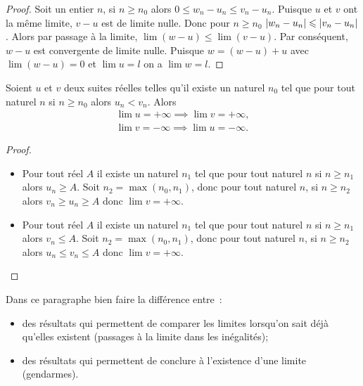 \begin{proof}
    Soit un entier \(n\), si \(n \geqslant n_0\) alors \(0 \leqslant w_n-u_n
    \leqslant v_n -u_n\). Puisque \(u\) et \(v\) ont la même limite, \(v-u\) est
    de limite nulle. Donc pour \(n \geqslant n_0\) \(\left\lvert w_n-u_n\right\rvert \leqslant
    \left\lvert v_n-u_n\right\rvert\). Alors par passage à la limite, \(\lim (w-u) \leqslant \lim
    (v-u)\). Par conséquent, \(w-u\) est convergente de limite nulle. Puisque \(w
    = (w-u)+u\) avec \(\lim (w-u) = 0\) et \(\lim u = l\) on a \(\lim w =l\).
\end{proof}
\begin{prop}
    Soient \(u\) et \(v\) deux suites réelles telles qu'il existe un naturel
    \(n_0\) tel que pour tout naturel \(n\) si \(n \geqslant n_0\) alors
    \(u_n<v_n\). Alors
    \begin{gather}
        \lim u =+\infty \implies \lim v =+\infty,\\
        \lim v =-\infty \implies \lim u =-\infty.
    \end{gather}
\end{prop}
\begin{proof}
    \begin{itemize}
        \item Pour tout réel \(A\) il existe un naturel \(n_1\) tel que pour tout
            naturel \(n\) si \(n \geqslant n_1\) alors \(u_n \geqslant A\). Soit \(n_2
            = \max(n_0,n_1)\), donc pour tout naturel \(n\), si \(n \geqslant n_2\)
            alors \(v_n \geqslant u_n \geqslant A\) donc \(\lim v = +\infty\).
        \item Pour tout réel \(A\) il existe un naturel \(n_1\) tel que pour tout
            naturel \(n\) si \(n \geqslant n_1\) alors \(v_n \leqslant A\). Soit \(n_2
            = \max(n_0,n_1)\), donc pour tout naturel \(n\), si \(n \geqslant n_2\)
            alors \(u_n \leqslant v_n \leqslant A\) donc \(\lim v = +\infty\).
    \end{itemize}
\end{proof}
Dans ce paragraphe bien faire la différence entre~:
\begin{itemize}
    \item des résultats qui permettent de comparer les limites lorsqu'on sait déjà
        qu'elles existent (passages à la limite dans les inégalités);
    \item des résultats qui permettent de conclure à l'existence d'une limite
        (gendarmes).
\end{itemize}

